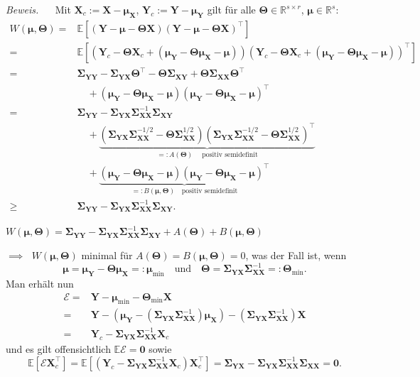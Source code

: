 \documentclass[12pt, aspectratio=169]{beamer}
\newcommand{\E}{\mathbb{E}}
\newcommand{\R}{\mathbb{R}}
\newcommand{\X}{\mathbf{X}}
\newcommand{\Y}{\mathbf{Y}}
\newcommand{\T}{\bm{\Theta}}
\newcommand{\muu}{\bm{\mu}}
\newcommand{\Ssigma}{\bm{\Sigma}}
\begin{document}
\begin{frame}
	\textit{Beweis.} $\quad$
	Mit $\X_c := \X - \muu_\X$, $\Y_c := \Y - \muu_\Y$ gilt für alle $\T \in \R^{s \times r}$, $\muu \in \R^s$:
	\begin{align*}
		W(\muu, \T) ={}& \E[(\Y - \muu - \T \X)(\Y - \muu - \T \X)^\top] \\
		={}& \E[(\Y_c - \T \X_c + (\muu_\Y - \T \muu_\X - \muu))(\Y_c - \T \X_c + (\muu_\Y - \T \muu_\X - \muu))^\top] \\
		={}& \Ssigma_{\Y\Y} - \Ssigma_{\Y\X} \T^\top - \T \Ssigma_{\X\Y} + \T \Ssigma_{\X\X} \T^\top \\
		& \quad + (\muu_\Y - \T \muu_\X - \muu)(\muu_\Y - \T \muu_\X - \muu)^\top \\
		={}& \Ssigma_{\Y\Y} - \Ssigma_{\Y\X} \Ssigma_{\X\X}^{-1} \Ssigma_{\X\Y} \\
		& \quad + \underbrace{(\Ssigma_{\Y\X} \Ssigma_{\X\X}^{-1/2} - \T \Ssigma_{\X\X}^{1/2})(\Ssigma_{\Y\X} \Ssigma_{\X\X}^{-1/2} - \T \Ssigma_{\X\X}^{1/2})^\top}_{=: A(\T) \quad \text{ positiv semidefinit}} \\
		& \quad + \underbrace{(\muu_\Y - \T \muu_\X - \muu)(\muu_\Y - \T \muu_\X - \muu)^\top}_{=:B(\muu, \T) \quad \text{positiv semidefinit}} \\
		\geq{}& \Ssigma_{\Y\Y} - \Ssigma_{\Y\X} \Ssigma_{\X\X}^{-1} \Ssigma_{\X\Y} \text{.}
	\end{align*}
\end{frame}
\begin{frame}
	\begin{alertblock}{}
		\begin{center}
			$W(\muu, \T) = \Ssigma_{\Y\Y} - \Ssigma_{\Y\X} \Ssigma_{\X\X}^{-1} \Ssigma_{\X\Y} + A(\T) + B(\muu, \T)$
		\end{center}
	\end{alertblock}
	$\implies\;$ $W(\muu, \T)$ minimal für $A(\T) = B(\muu, \T) = 0$, was der Fall ist, wenn
	$$ \muu = \muu_\Y - \T \muu_\X =: \muu_{\min} \quad \text{und} \quad \T = \Ssigma_{\Y\X} \Ssigma_{\X\X}^{-1} =: \T_{\min} \text{.}$$
	Man erhält nun
	\begin{align*}
	\mathcal{E} ={}& \Y - \muu_{\min} - \T_{\min} \X \\
	={}& \Y - (\muu_\Y - (\Ssigma_{\Y\X} \Ssigma_{\X\X}^{-1}) \muu_\X) - (\Ssigma_{\Y\X} \Ssigma_{\X\X}^{-1}) \X \\
	={}& \Y_c - \Ssigma_{\Y\X} \Ssigma_{\X\X}^{-1} \X_c
	\end{align*}
	und es gilt offensichtlich $\E \mathcal{E} = \mathbf{0}$ sowie
	$$\E[\mathcal{E} \X_c^\top] = \E[(\Y_c - \Ssigma_{\Y\X} \Ssigma_{\X\X}^{-1} \X_c) \X_c^\top] = \Ssigma_{\Y\X} - \Ssigma_{\Y\X}\Ssigma_{\X\X}^{-1} \Ssigma_{\X\X} = \mathbf{0} \text{.}$$
	\hfill \qedsymbol
\end{frame}
\end{document}
